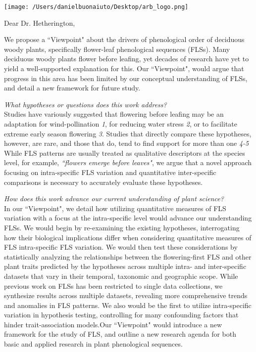 \documentclass[10.5pt,a4paper]{letter}\usepackage[]{graphicx}\usepackage[]{color}
\begin{document}

\def\labelitemi{--}
\parindent=24pt
\texttt{[image: /Users/danielbuonaiuto/Desktop/arb\_logo.png]}

\opening{Dear Dr. Hetherington,}
\par We propose a ``Viewpoint" about the drivers of phenological order of deciduous woody plants, specifically flower-leaf phenological sequences (FLSs). Many deciduous woody plants flower before leafing, yet decades of research have yet to yield a well-supported explanation for this.  Our ``Viewpoint", would argue that progress in this area has been limited by our conceptual understanding of FLSs, and detail a new framework for future study.
\par\emph{What hypotheses or questions does this work address?}\\
\indent Studies have variously suggested that flowering before leafing may be an adaptation for wind-pollination \emph{1}, for reducing water stress \emph{2}, or to facilitate extreme early season flowering \emph{3}. Studies that directly compare these hypotheses, however, are rare, and those that do, tend to find support for more than one \emph{4-5} While FLS patterns are usually treated as qualitative descriptors at the species level, for example, \textit{``flowers emerge before leaves"}, we argue that a novel approach focusing on intra-specific FLS variation and quantitative inter-specific comparisons is necessary to accurately evaluate these hypotheses.%
\par\emph{How does this work advance our current understanding of plant science?}\\
\indent In our ``Viewpoint", we detail how utilizing quantitative measures of FLS variation with a focus at the intra-specific level would advance our understanding FLSs. We would begin by re-examining the existing hypotheses, interrogating how their biological implications differ when considering quantitative measures of FLS intra-specific FLS variation. We would then test these considerations by statistically analyzing the relationships between the flowering-first FLS and other plant traits predicted by the hypotheses across multiple intra- and inter-specific datasets that vary in their temporal, taxonomic and geographic scope. While previous work on FLSs has been restricted to single data collections, we synthesize results across multiple datasets, revealing more comprehensive trends and anomalies in FLS patterns. We also would be the first to utilize intra-specific variation in hypothesis testing, controlling for many confounding factors that hinder trait-association models.Our ``Viewpoint" would introduce a new framework for the study of FLS, and outline a new research agenda for both basic and applied research in plant phenological sequences.
\end{document}
